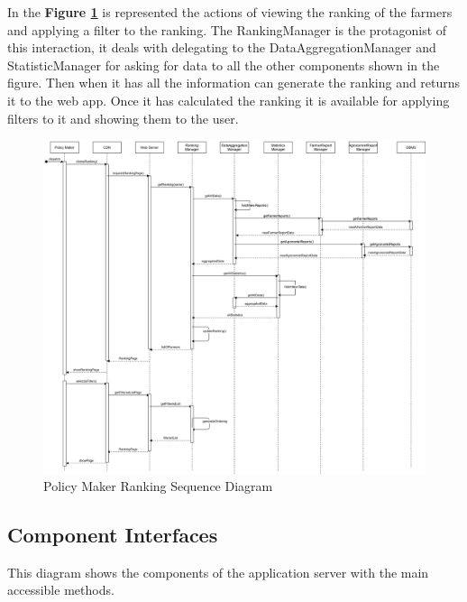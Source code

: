 \noindent
In the  \textbf{Figure \ref{fig:policyMakerRankingSequenceDiagram}} is represented the actions of viewing the ranking of the farmers and applying a filter to the ranking. The RankingManager is the protagonist of this interaction, it deals with delegating to the DataAggregationManager and StatisticManager for asking for data to all the other components shown in the figure. Then when it has all the information can generate the ranking and returns it to the web app.
Once it has calculated the ranking it is available for applying filters to it and showing them to the user.\\

\begin{figure}[hbt!]
\centering
\includegraphics[width=\textwidth]{../images_diagrams/dd/policyMakerSequenceDiaEXT.drawio.png}
\caption{Policy Maker Ranking Sequence Diagram}
\label{fig:policyMakerRankingSequenceDiagram}
\end{figure}

\newpage
\subsection{Component Interfaces}
This diagram shows the components of the application server with the main accessible methods.\\

